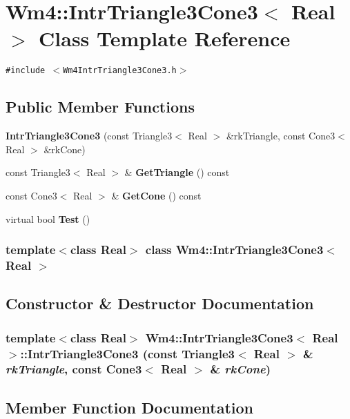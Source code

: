 \section{Wm4::Intr\-Triangle3Cone3$<$ Real $>$ Class Template Reference}
\label{classWm4_1_1IntrTriangle3Cone3}
{\tt \#include $<$Wm4Intr\-Triangle3Cone3.h$>$}

\subsection*{Public Member Functions}
\begin{CompactItemize}
\item 
{\bf Intr\-Triangle3Cone3} (const Triangle3$<$ Real $>$ \&rk\-Triangle, const Cone3$<$ Real $>$ \&rk\-Cone)
\item 
const Triangle3$<$ Real $>$ \& {\bf Get\-Triangle} () const
\item 
const Cone3$<$ Real $>$ \& {\bf Get\-Cone} () const
\item 
virtual bool {\bf Test} ()
\end{CompactItemize}
\subsubsection*{template$<$class Real$>$ class Wm4::Intr\-Triangle3Cone3$<$ Real $>$}



\subsection{Constructor \& Destructor Documentation}
\subsubsection{\setlength{\rightskip}{0pt plus 5cm}template$<$class Real$>$ {\bf Wm4::Intr\-Triangle3Cone3}$<$ Real $>$::{\bf Intr\-Triangle3Cone3} (const Triangle3$<$ Real $>$ \& {\em rk\-Triangle}, const Cone3$<$ Real $>$ \& {\em rk\-Cone})}\label{classWm4_1_1IntrTriangle3Cone3_86caba9024ef7f4f202ec11627ea37e5}




\subsection{Member Function Documentation}
